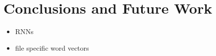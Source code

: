 \section{Conclusions and Future Work}
\label{sec:conclusions}

\begin{itemize}
  \item RNNs
  \item file specific word vectors
\end{itemize}
